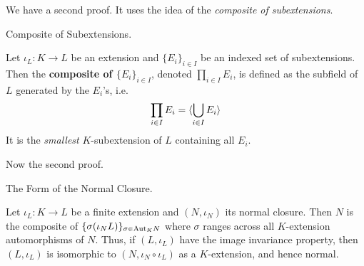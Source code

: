 \documentclass[../book.tex]{subfiles}
\begin{document}
We have a second proof. 
It uses the idea of the \emph{composite of subextensions}. 

\begin{dfn} Composite of Subextensions.
    
    Let $\iota_L : K \to L$ be an extension
    and $\{E_i\}_{i\in I}$ be an indexed set of subextensions.
    Then the \textbf{composite of $\{E_i\}_{i\in I}$}, 
    denoted $\prod_{i\in I} E_i$, 
    is defined as the subfield of $L$ generated by the $E_i$'s, i.e. \[
        \prod_{i\in I} E_i = \langle\bigcup_{i\in I} E_i\rangle
    \]
    It is the \emph{smallest} $K$-subextension of $L$ containing all $E_i$. 
\end{dfn}

Now the second proof. 

\begin{thm} The Form of the Normal Closure.
    
    Let $\iota_L : K \to L$ be a finite extension 
    and $(N,\iota_N)$ its normal closure.
    Then $N$ is the composite of $\{\sigma(\iota_N L)\}_{\sigma \in \mathrm{Aut}_{K}N}$
    where $\sigma$ ranges across all $K$-extension automorphisms of $N$. 
    Thus, if $(L,\iota_L)$ have the image invariance property,
    then $(L,\iota_L)$ is isomorphic 
    to $(N,\iota_N\circ\iota_L)$ as a $K$-extension,
    and hence normal. 
\end{thm}
\end{document}
